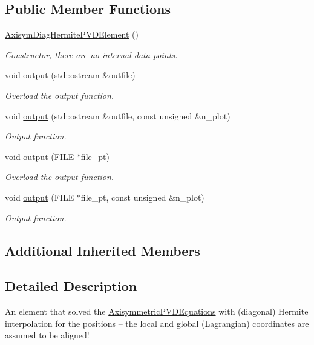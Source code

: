 \subsection*{Public Member Functions}
\begin{DoxyCompactItemize}
\item 
\hyperlink{classoomph_1_1AxisymDiagHermitePVDElement_aecf4d648813650af46a492b1aef2c8d4}{Axisym\+Diag\+Hermite\+P\+V\+D\+Element} ()
\begin{DoxyCompactList}\small\item\em Constructor, there are no internal data points. \end{DoxyCompactList}\item 
void \hyperlink{classoomph_1_1AxisymDiagHermitePVDElement_a6b513539d6607d36d0e048a289fc7a46}{output} (std\+::ostream \&outfile)
\begin{DoxyCompactList}\small\item\em Overload the output function. \end{DoxyCompactList}\item 
void \hyperlink{classoomph_1_1AxisymDiagHermitePVDElement_af5a83e5da70d404bc5e158704d757b56}{output} (std\+::ostream \&outfile, const unsigned \&n\+\_\+plot)
\begin{DoxyCompactList}\small\item\em Output function. \end{DoxyCompactList}\item 
void \hyperlink{classoomph_1_1AxisymDiagHermitePVDElement_a96c36dd119e64e6afb19b813ecbf33b8}{output} (F\+I\+LE $\ast$file\+\_\+pt)
\begin{DoxyCompactList}\small\item\em Overload the output function. \end{DoxyCompactList}\item 
void \hyperlink{classoomph_1_1AxisymDiagHermitePVDElement_adb95d8bc9f3177ae6c49f62fe48a1902}{output} (F\+I\+LE $\ast$file\+\_\+pt, const unsigned \&n\+\_\+plot)
\begin{DoxyCompactList}\small\item\em Output function. \end{DoxyCompactList}\end{DoxyCompactItemize}
\subsection*{Additional Inherited Members}


\subsection{Detailed Description}
An element that solved the \hyperlink{classoomph_1_1AxisymmetricPVDEquations}{Axisymmetric\+P\+V\+D\+Equations} with (diagonal) Hermite interpolation for the positions -- the local and global (Lagrangian) coordinates are assumed to be aligned! 

